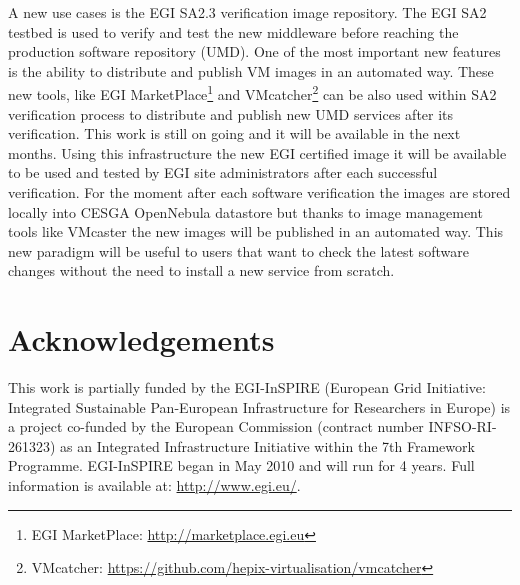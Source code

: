 \documentclass{llncs_Ibergrid2013}
\begin{document}
A new use cases is the EGI SA2.3 verification image repository. The EGI SA2 testbed is used to verify and test the new middleware before reaching the production software repository (UMD).
One of the most important new features is the ability to distribute and publish VM images in an automated way. 
These new tools, like EGI MarketPlace\footnote{EGI MarketPlace: \url{http://marketplace.egi.eu}} and VMcatcher\footnote{VMcatcher: \url{https://github.com/hepix-virtualisation/vmcatcher}} can be also used within SA2 verification process to distribute and publish new UMD services after its verification. 
This work is still on going and it will be available in the next months. Using this infrastructure the new EGI certified image it will be available to be used and tested by EGI site administrators after each successful verification.
For the moment after each software verification the images are stored locally into CESGA OpenNebula datastore but thanks to image management tools like VMcaster the new images will be published in an automated way.
This new paradigm will be useful to users that want to check the latest software changes without the need to install a new service from scratch.


\section*{Acknowledgements}
\label{sect-acknowledgements}
This work is partially funded by the  EGI-InSPIRE (European Grid Initiative: Integrated Sustainable
Pan-European Infrastructure for Researchers in Europe) is a project co-funded by the European Commission 
(contract number INFSO-RI-261323) as an Integrated Infrastructure Initiative within the 7th Framework 
Programme. EGI-InSPIRE began in May 2010 and will run for 4 years. Full information is available at:
\url{http://www.egi.eu/}.

%
%
%


%



\end{document}

